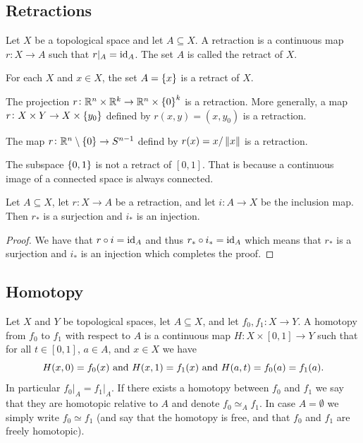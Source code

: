\documentclass[11pt,a4paper]{article}
\begin{document}
\subsection{Retractions}
\begin{definition}[Retraction]
  Let $X$ be a topological space and let $A \subseteq X$.
  A retraction is a continuous map $r \colon X \to A$ such that
  $r\vert_A = \operatorname{id}_A$.
  The set $A$ is called the retract of $X$.
\end{definition}
\begin{example}
  For each $X$ and $x \in X$, the set $A = \left\{x\right\}$ is a retract of $X$.
\end{example}
\begin{example}
  The projection $r \colon \mathbb{R}^n \times \mathbb{R}^k \to \mathbb{R}^n \times \left\{0\right\}^k$
  is a retraction.
  More generally, a map $r \colon X \times Y \to X \times \left\{y_0\right\}$
  defined by $r(x,y) = (x,y_0)$ is a retraction.
\end{example}
\begin{example}
  The map $r \colon \mathbb{R}^n \setminus \left\{0\right\} \to S^{n-1}$ defind by
  $r(x) = x / \left\lVert x\right\rVert$ is a retraction.
\end{example}
\begin{example}
  The subspace $\left\{0,1\right\}$ is not a retract of $[0,1]$.
  That is because a continuous image of a connected space is always connected.
\end{example}

\begin{proposition}
  Let $A \subseteq X$, let $r \colon X \to A$ be a retraction, and let
  $i \colon A \to X$ be the inclusion map.
  Then $r_*$ is a surjection and $i_*$ is an injection.
\end{proposition}
\begin{proof}
  We have that $r \circ i = \operatorname{id}_A$ and thus $r_* \circ i_* = \operatorname{id}_A$
  which means that $r_*$ is a surjection and $i_*$ is an injection
  which completes the proof.
\end{proof}

\subsection{Homotopy}
\begin{definition}[Homotopy]
  Let $X$ and $Y$ be topological spaces, let $A \subseteq X$, and let
  $f_0,f_1 \colon X \to Y$.
  A homotopy from $f_0$ to $f_1$ with respect to $A$ is a continuous
  map $H \colon X \times [0,1] \to Y$ such that for all $t \in [0,1]$,
  $a \in A$, and $x \in X$ we have
  \[
    H(x,0) = f_0(x) \text{ and }
    H(x,1) = f_1(x) \text{ and }
    H(a,t) = f_0(a) = f_1(a).
  \]
  In particular $f_0\vert_A = f_1\vert_A$.
  If there exists a homotopy between $f_0$ and $f_1$ we say that they
  are homotopic relative to $A$ and denote $f_0 \simeq_A f_1$.
  In case $A = \emptyset$ we simply write $f_0 \simeq f_1$ (and say
  that the homotopy is free, and that $f_0$ and $f_1$ are freely homotopic).
\end{definition}
\end{document}
